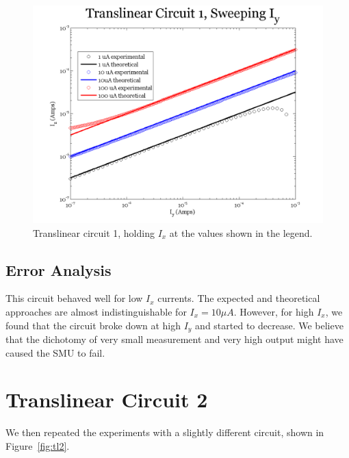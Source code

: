 \documentclass{article}
\begin{document}
\begin{figure}[H]
\begin{center}
\includegraphics[scale=.75]{exp2_sweepy.png}
\caption{Translinear circuit 1, holding $I_x$ at the values shown in the legend.}
\label{fig:exp2sweepy}
\end{center}
\end{figure}

\subsection*{Error Analysis}

This circuit behaved well for low $I_x$ currents.  The expected and theoretical approaches are almost indistinguishable for $I_x = 10 \mu A$.  However, for high $I_x$, we found that the circuit broke down at high $I_y$ and started to decrease.  We believe that the dichotomy of very small measurement and very high output might have caused the SMU to fail.

\section*{Translinear Circuit 2}

We then repeated the experiments with a slightly different circuit, shown in Figure~\ref{fig:tl2}.
\end{document}
